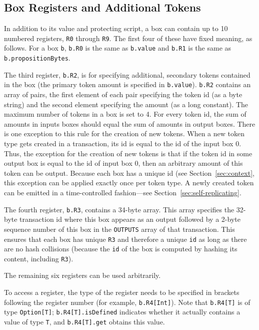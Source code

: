 \documentclass[11pt]{article}
\newcommand{\authnote}[2]{\marginpar{\parbox{\marginparwidth}{\tiny %
  \textsf{#1 {\textcolor{blue}{notes: #2}}}}}%
  \textcolor{blue}{\textbf{\dag}}}
\newcommand{\authnote}[2]{
  \textsf{#1 \textcolor{blue}{: #2}}}
\newcommand{\authnote}[2]{}
\newcommand{\lnote}[1]{{\authnote{\textcolor{orange}{Leo notes}}{#1}}}
\begin{document}
\subsection{Box Registers and Additional Tokens}
\label{sec:box-registers}
In addition to its value and protecting script, a box can contain up to 10 numbered registers, \texttt{R0} through \texttt{R9}. The first four of these have fixed meaning, as follows. For a box \texttt{b}, \texttt{b.R0} is the same as \texttt{b.value} and \texttt{b.R1} is the same as \texttt{b.propositionBytes}. 


The third register, \texttt{b.R2}, is for specifying additional, secondary tokens contained in the box (the primary token amount is specified in \texttt{b.value}). \texttt{b.R2} contains an array of pairs, the first element of each pair specifying the token id (as a byte string) and the second element specifying the amount (as a long constant). The maximum number of tokens in a box is set to 4. For every token id, the sum of amounts in inputs boxes should equal the sum of amounts in output boxes. There is one exception to this rule for the creation of new tokens. When a new token type gets created in a transaction, its id is equal to the id of the input box 0. Thus, the exception for the creation of new tokens is that if the token id in some output box is equal to the id of input box 0, then an arbitrary amount of this token can be output. Because each box has a unique id (see Section~\ref{sec:context}, this exception can be applied exactly once per token type. A newly created token can be emitted in a time-controlled fashion---see Section~\ref{sec:self-replicating}.



The fourth register, \texttt{b.R3}, contains a 34-byte array. This array specifies the 32-byte transaction id \lnote{how is transaction id computed?} where this box appears as an output followed by a 2-byte sequence number of this box in the \texttt{OUTPUTS} array of that transaction. This ensures that each box has unique \texttt{R3} and therefore a unique \texttt{id} as long as there are no hash collisions (because the \texttt{id} of the box is computed by hashing its content, including \texttt{R3}).

The remaining six registers can be used arbitrarily. 

To access a register, the type of the register needs to be specified in brackets following the register number (for example, \texttt{b.R4[Int]}). Note that \texttt{b.R4[T]} is of type \texttt{Option[T]}; \texttt{b.R4[T].isDefined} indicates whether it actually contains a value of type \texttt{T}, and \texttt{b.R4[T].get} obtains this value.
\end{document}
